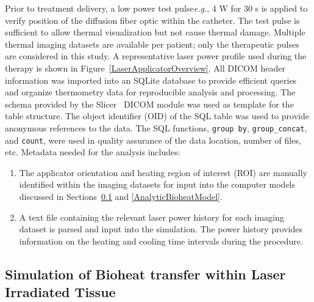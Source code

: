 \documentclass[12pt]{article}
\begin{document}
Prior to treatment delivery, a low power test pulse\textemdash\textit{e.g.}, 4 W for 30 s\textemdash
is applied to verify position of the diffusion fiber optic within the catheter.  
The test pulse is
sufficient to allow thermal visualization but not cause thermal damage. 
Multiple thermal imaging datasets are available per patient;
only the {\color{red}therapeutic} pulses are considered in this study.
A representative laser power profile used
during the therapy is shown in Figure~\ref{LaserApplicatorOverview}. 
All DICOM header information was imported into an SQLite database 
to provide efficient queries and 
organize thermometry data for reproducible analysis and processing. 
The schema provided by the Slicer~\cite{yeniaras2013design} DICOM
module was used as template for the table structure.
The object identifier (OID)
of the SQL table was used to provide anonymous references to the data.
The SQL functions,  \verb#group by#, \verb#group_concat#, and \verb#count#,
were used in quality assurance of the data
location, number of files, etc.
Metadata needed for the analysis includes:
\begin{enumerate}
\item The applicator orientation and heating region of interest (ROI)
are manually identified within the imaging datasets for input into the
computer models discussed in Sections~\ref{BioheatComputerModel} and \ref{AnalyticBioheatModel}.
\item A text file containing the relevant laser power history for each imaging
dataset is parsed and input into the simulation. The power history provides
information on the heating and cooling time intervals during the procedure.
\end{enumerate}



\subsection{Simulation of Bioheat transfer within Laser Irradiated Tissue}\label{BioheatComputerModel}
\end{document}
